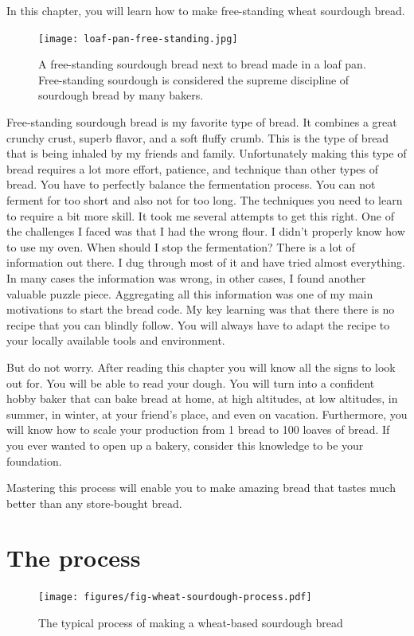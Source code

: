 In this chapter, you will learn how to make
free-standing wheat sourdough bread.

\begin{figure}[!htb]
  \texttt{[image: loaf-pan-free-standing.jpg]}
  \caption{A free-standing sourdough bread next to bread made in a loaf pan.
  Free-standing sourdough is considered the supreme discipline of sourdough bread by many bakers.
  }
\end{figure}

Free-standing sourdough bread is my favorite
type of bread. It combines a great crunchy crust, superb
flavor, and a soft fluffy crumb. This is the type of bread
that is being inhaled by my friends and family. Unfortunately
making this type of bread requires a lot more effort, patience,
and technique than other types of bread. You have to perfectly
balance the fermentation process. You can not ferment for too
short and also not for too long. The techniques you need to
learn to require a bit more skill. It took me several attempts
to get this right. One of the challenges I faced was that
I had the wrong flour. I didn't properly know how to use my oven.
When should I stop the fermentation? There is a lot of information
out there. I dug through most of it and have tried almost everything.
In many cases the information was wrong, in other cases, I
found another valuable puzzle piece. Aggregating all this
information was one of my main motivations to start the bread code.
My key learning was that there there is no recipe that
you can blindly follow. You will always have to adapt the recipe
to your locally available tools and environment.

But do not worry. After reading this chapter you will know
all the signs to look out for. You will be able to read your dough.
You will turn into a confident hobby baker that can bake bread
at home, at high altitudes, at low altitudes, in summer, in winter,
at your friend's place, and even on vacation. Furthermore,
you will know how to scale your production from 1 bread to 100 loaves of bread.
If you ever wanted to open up a bakery, consider this knowledge to
be your foundation.

Mastering this process will enable you to make amazing bread
that tastes much better than any store-bought bread.

\section{The process}

\begin{figure}[!htb]
  \texttt{[image: figures/fig-wheat-sourdough-process.pdf]}
  \caption{The typical process of making a wheat-based sourdough bread}
  \label{fig:wheat-sourdough-process}
\end{figure}

